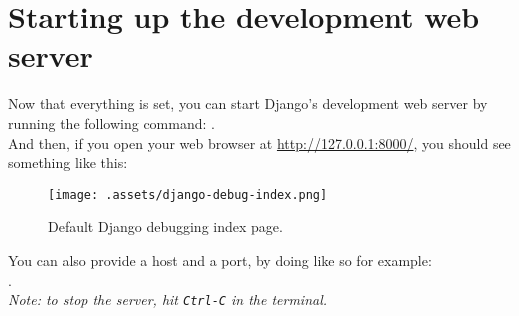 \section{Starting up the development web server}
    Now that everything is set, you can start Django's development web server 
    by running the following command:
    .\\
    
    And then, if you open your web browser at \url{http://127.0.0.1:8000/}, 
    you should see something like this:
    
    \begin{figure}[H]
        \centering
        \texttt{[image: .assets/django-debug-index.png]}
        \caption{Default Django debugging index page.}
    \end{figure}
  
    \newpage
    
    You can also provide a host and a port, by doing like so for example:\\
    . \\
    
    \emph{Note: to stop the server, hit \texttt{Ctrl-C} in the terminal.}
